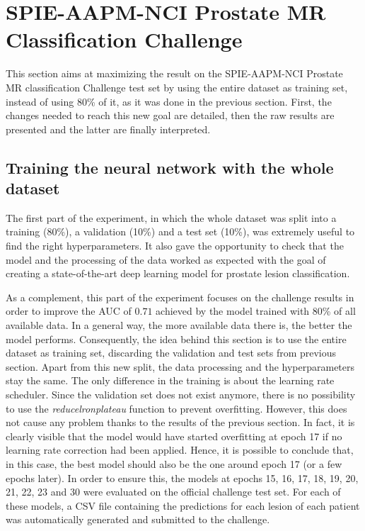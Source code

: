 \newpage
\section{SPIE-AAPM-NCI Prostate MR Classification Challenge}
\label{sec:classification_challenge}
\setlength{\marginparwidth}{3cm}\leavevmode {}This section aims at maximizing the result on the SPIE-AAPM-NCI Prostate MR classification Challenge test set by using the entire dataset as training set, instead of using 80\% of it, as it was done in the previous section. First, the changes needed to reach this new goal are detailed, then the raw results are presented and the latter are finally interpreted.

\subsection{Training the neural network with the whole dataset}
\setlength{\marginparwidth}{3cm}\leavevmode {}The first part of the experiment, in which the whole dataset was split into a training (80\%), a validation (10\%) and a test set (10\%), was extremely useful to find the right hyperparameters. It also gave the opportunity to check that the model and the processing of the data worked as expected with the goal of creating a state-of-the-art deep learning model for prostate lesion classification.

As a complement, this part of the experiment focuses on the challenge results in order to improve the AUC of $0.71$ achieved by the model trained with 80\% of all available data. In a general way, the more available data there is, the better the model performs. Consequently, the idea behind this section is to use the entire dataset as training set, discarding the validation and test sets from previous section. Apart from this new split, the data processing and the hyperparameters stay the same. The only difference in the training is about the learning rate scheduler. Since the validation set does not exist anymore, there is no possibility to use the \textit{reducelronplateau} function to prevent overfitting. However, this does not cause any problem thanks to the results of the previous section. In fact, it is clearly visible that the model would have started overfitting at epoch 17 if no learning rate correction had been applied. Hence, it is possible to conclude that, in this case, the best model should also be the one around epoch 17 (or a few epochs later). In order to ensure this, the models at epochs 15, 16, 17, 18, 19, 20, 21, 22, 23 and 30 were evaluated on the official challenge test set. For each of these models, a CSV file containing the predictions for each lesion of each patient was automatically generated and submitted to the challenge.

